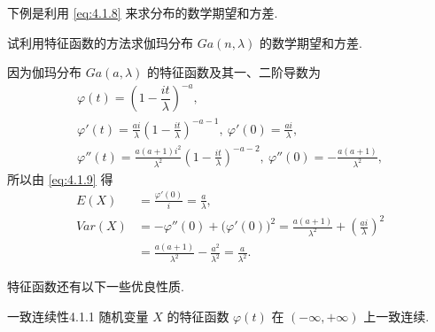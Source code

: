 下例是利用 \eqref{eq:4.1.8} 来求分布的数学期望和方差.

\begin{example}\label{exam:4.1.3}
    试利用特征函数的方法求伽玛分布 $ Ga ( n, \lambda ) $ 的数学期望和方差.
\end{example}

\begin{solution}
    因为伽玛分布 $ Ga ( a, \lambda ) $ 的特征函数及其一、二阶导数为
    \begin{gather*}
        \varphi (t) = \left( 1 - \dfrac{it}{\lambda} \right)^{-a},\\
        \varphi' (t) = \frac{ai}{\lambda} \left( 1 - \frac{it}{\lambda} \right)^{-a-1}, \ \varphi' (0) = \frac{ai}{\lambda},\\
        \varphi'' (t) = \frac{a ( a + 1 ) i^2}{\lambda^2} \left( 1 - \frac{it}{\lambda} \right)^{-a-2}, \ \varphi'' (0) = -\frac{a (a+1)}{\lambda^2},
    \end{gather*}
    所以由 \eqref{eq:4.1.9} 得
    \begin{align*}
        E (X) & = \frac{\varphi' (0)}{i} = \frac{a}{\lambda},\\
        Var (X) & = - \varphi'' (0) + \bigl( \varphi' (0) \bigr)^2 = \frac{a (a+1)}{\lambda^2} + \left( \frac{ai}{\lambda} \right)^2\\
        & = \frac{a (a+1)}{\lambda^2} - \frac{a^2}{\lambda^2} = \frac{a}{\lambda^2}.
    \end{align*}
\end{solution}

特征函数还有以下一些优良性质.

\begin{theorem}{一致连续性}{4.1.1}
    随机变量 $ X $ 的特征函数 $ \varphi (t) $ 在 $ ( -\infty, +\infty ) $ 上一致连续.
\end{theorem}

